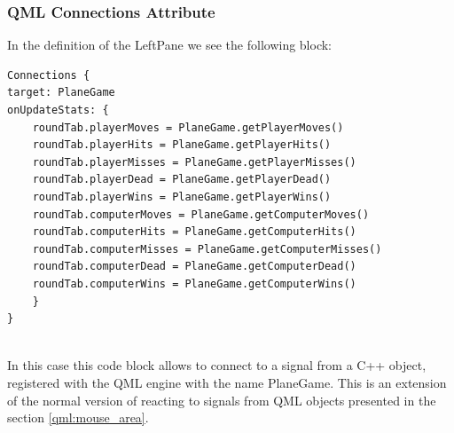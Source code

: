 \subsubsection {QML Connections Attribute} \label{qml:connections}

In the definition of the LeftPane we see the following block:

\begin{lstlisting}
Connections {
target: PlaneGame
onUpdateStats: {
	roundTab.playerMoves = PlaneGame.getPlayerMoves()
	roundTab.playerHits = PlaneGame.getPlayerHits()
	roundTab.playerMisses = PlaneGame.getPlayerMisses()
	roundTab.playerDead = PlaneGame.getPlayerDead()
	roundTab.playerWins = PlaneGame.getPlayerWins()
	roundTab.computerMoves = PlaneGame.getComputerMoves()
	roundTab.computerHits = PlaneGame.getComputerHits()
	roundTab.computerMisses = PlaneGame.getComputerMisses()
	roundTab.computerDead = PlaneGame.getComputerDead()
	roundTab.computerWins = PlaneGame.getComputerWins()
	}
}
	
\end{lstlisting}

In this case this code block allows to connect to a signal from a C++ object, registered with the QML engine with the name PlaneGame. 
This is an extension of the normal version of reacting to signals from QML objects presented in the section \ref{qml:mouse_area}.